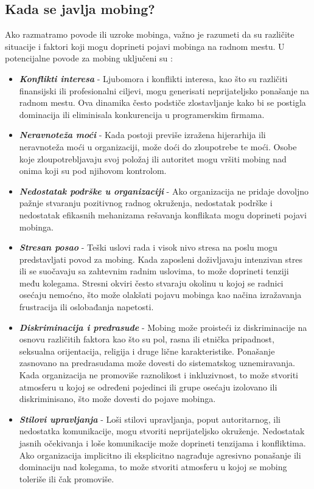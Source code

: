 \documentclass[a4paper]{article}
\begin{document}
    \subsection{Kada se javlja mobing?}
        Ako razmatramo povode ili uzroke mobinga, važno je razumeti da su različite situacije i faktori koji mogu doprineti pojavi mobinga na radnom mestu.
        U potencijalne povode za mobing uključeni su \cite{ELCI2014455, ERGIN2023115595, ERTURK20143669, VARAHORNA2023e21096}:
        \begin{itemize}
            \item \textbf{\textit{Konflikti interesa}} - Ljubomora i konflikti interesa, kao što su različiti finansijski ili profesionalni ciljevi, mogu generisati neprijateljsko ponašanje na radnom mestu. Ova dinamika često podstiče zlostavljanje kako bi se postigla dominacija ili eliminisala konkurencija u programerskim firmama.
            \item \textbf{\textit{Neravnoteža moći}} - Kada postoji previše izražena hijerarhija ili neravnoteža moći u organizaciji, može doći do zloupotrebe te moći. Osobe koje zloupotrebljavaju svoj položaj ili autoritet mogu vršiti mobing nad onima koji su pod njihovom kontrolom.
            \item \textbf{\textit{Nedostatak podrške u organizaciji}} - Ako organizacija ne pridaje dovoljno pažnje stvaranju pozitivnog radnog okruženja, nedostatak podrške i nedostatak efikasnih mehanizama rešavanja konflikata mogu doprineti pojavi mobinga.
            \item \textbf{\textit{Stresan posao}} - Teški uslovi rada i visok nivo stresa na poslu mogu predstavljati povod za mobing. Kada zaposleni doživljavaju intenzivan stres ili se suočavaju sa zahtevnim radnim uslovima, to može doprineti tenziji među kolegama. Stresni okviri često stvaraju okolinu u kojoj se radnici osećaju nemoćno, što može olakšati pojavu mobinga kao načina izražavanja frustracija ili oslobađanja napetosti.
            \item \textbf{\textit{Diskriminacija i predrasude}} - Mobing može proisteći iz diskriminacije na osnovu različitih faktora kao što su pol, rasna ili etnička pripadnost, seksualna orijentacija, religija i druge lične karakteristike. Ponašanje zasnovano na predrasudama može dovesti do sistematskog uznemiravanja. Kada organizacija ne promoviše raznolikost i inkluzivnost, to može stvoriti atmosferu u kojoj se određeni pojedinci ili grupe osećaju izolovano ili diskriminisano, što može dovesti do pojave mobinga.
            \item \textbf{\textit{Stilovi upravljanja}} - Loši stilovi upravljanja, poput autoritarnog, ili nedostatka komunikacije, mogu stvoriti neprijateljsko okruženje. Nedostatak jasnih očekivanja i loše komunikacije može doprineti tenzijama i konfliktima. Ako organizacija implicitno ili eksplicitno nagrađuje agresivno ponašanje ili dominaciju nad kolegama, to može stvoriti atmosferu u kojoj se mobing toleriše ili čak promoviše.

\end{itemize}
\end{document}
